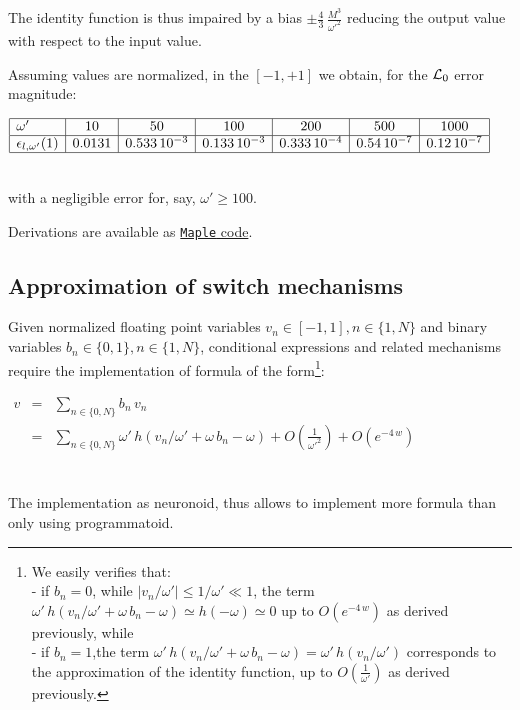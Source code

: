 \documentclass[a4]{article}
\newcommand{\eqline}[1]{~\vspace{0.1cm}\\\centerline{$#1$}\vspace{0.1cm}\\}
\begin{document}
The identity function is thus impaired by a bias $\pm \frac{4}{3} \, \frac{M^3}{\omega'^2}$ reducing the output value with respect to the input value.

Assuming values are normalized, in the $[-1, +1]$ we obtain, for the ${\cal L}_0$ error magnitude:
\eqline{\begin{array}{|l|c|c|c|c|c|c|} \hline
\omega' & 10 & 50 & 100 & 200 & 500 & 1000  \\ \hline
\epsilon_{l,\omega'}(1) & 0.0131 &  0.533 \, 10^{-3} &  0.133 \, 10^{-3} &  0.333 \, 10^{-4} &  0.54\, 10^{-7} &  0.12\, 10^{-7}  \\ \hline
\end{array}}
with a negligible error for, say, $\omega'  \ge 100$.

Derivations are available as \href{https://raw.githubusercontent.com/vthierry/braincraft/master/doc/tex/linearapproximation.mpl.out.txt}{{\tt Maple} code}.

\subsection{Approximation of switch mechanisms}

Given normalized floating point variables $v_n \in [-1, 1], n \in \{1, N\}$ and binary variables $b_n \in \{0, 1\}, n \in \{1, N\}$, conditional expressions and related mechanisms require the implementation of formula of the form\footnote{We easily verifies that:
\\ - if $b_n= 0$, while $|v_n/\omega'| \le 1/\omega' \ll 1$, the term $\omega' \, h(v_n/\omega' + \omega \, b_n - \omega) \simeq h(- \omega) \simeq 0$ up to $O\left(e^{-4\,w}\right)$ as derived previously, while
\\ - if $b_n= 1$,the term $\omega' \, h(v_n/\omega' + \omega \, b_n - \omega) = \omega' \, h(v_n/\omega')$ corresponds to the approximation of the identity function, up to $O\left(\frac{1}{\omega'}\right)$ as derived previously.}:
\eqline{\begin{array}{rcl}
    v &=& \sum_{n \in \{0, N\}} b_n \, v_n \\
    &=& \sum_{n \in \{0, N\}} \omega' \, h(v_n/\omega' + \omega \, b_n - \omega) + O\left(\frac{1}{\omega'^2}\right)+ O\left(e^{-4\,w}\right) \\
\end{array}}

The implementation as neuronoid, thus allows to implement more formula than only using programmatoid.
\end{document}
